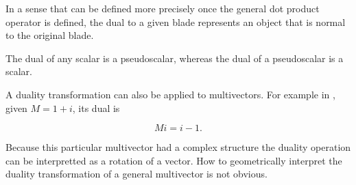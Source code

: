 In a sense that can be defined more precisely once the general dot product operator is defined, the dual to a given blade represents an object that is normal to the original blade.

The dual of any scalar is a pseudoscalar, whereas the dual of a pseudoscalar is a scalar.

A duality transformation can also be applied to multivectors.  
For example in , given \( M = 1 + i\), its dual is

\begin{dmath}\label{eqn:dual:n}
M i = i - 1.
\end{dmath}

Because this particular multivector had a complex structure the duality operation can be interpretted as a rotation of a vector.  
How to geometrically interpret the duality transformation of a general multivector is not obvious.


